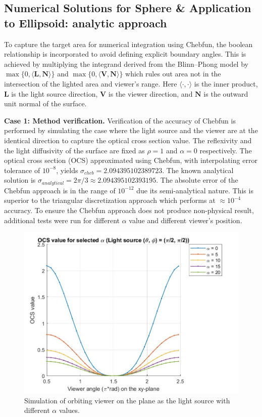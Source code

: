 \documentclass[11pt,reqno]{amsart}
\theoremstyle{definition}
\begin{document}
\subsection{Numerical Solutions for Sphere \& Application to Ellipsoid: analytic approach}
To capture the target area for numerical integration using Chebfun, the boolean
relationship is incorporated to avoid defining explicit boundary angles. This
is achieved by multiplying the integrand derived from the Blinn--Phong model by
$\max\{0, \langle \mathbf{L},\mathbf{N}\rangle\}$ and $\max\{0,\langle
\mathbf{V},\mathbf{N}\rangle\}$ which rules out area not in the intersection of
the lighted area and viewer's range. Here $\langle\cdot, \cdot\rangle$ is the
inner product, $\mathbf{L}$ is the light source direction, $\mathbf{V}$ is the
viewer direction, and $\mathbf{N}$ is the outward unit normal of the surface.

{\bf Case 1: Method verification.} Verification of the accuracy of Chebfun is performed by simulating the case where the light source and the viewer are at the identical direction to capture the optical cross section value. The reflexivity and the light diffusivity of the surface are fixed as $\rho = 1$ and $\alpha =0$ respectively. The optical cross section (OCS) approximated using Chebfun, with interpolating error tolerance of $10^{-8}$, yields $\sigma_{cheb} = 2.094395102389723$. The known analytical solution is $\sigma_{analytical} = 2\pi/3 \approx 2.094395102393195$. The absolute error of the Chebfun approach is in the range of $10^{-12}$ due its semi-analytical nature. This is superior to the triangular discretization approach which performs at $\approx 10^{-4}$ accuracy. To ensure the Chebfun approach does not produce non-physical result, additional tests were run for different $\alpha$ value and different viewer's position.

\begin{figure}[h]
\centering \includegraphics[scale=0.4]{./figs/OCS_parallel_plane}    
\caption{Simulation of orbiting viewer on the plane as the light source with different $\alpha$ values.}    
\label{OCSParallelPlane}
\end{figure}
\end{document}
